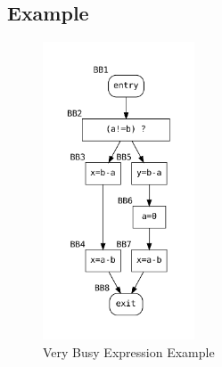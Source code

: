 \documentclass{article}
\begin{document}
\subsection{Example}

\begin{figure}[H]
	\centering
	\includegraphics[width=0.4\textwidth]{graphs/very_busy.pdf}
	\caption{Very Busy Expression Example}
	\label{fig:very-busy}
\end{figure}
\end{document}
